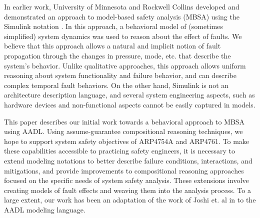 In earlier work, University of Minnesota and Rockwell Collins developed and demonstrated an approach to model-based safety analysis (MBSA) \cite {Joshi05:Dasc,Joshi05:SafeComp,NasaRep:MBSA-Aug05} using the Simulink notation \cite{MathWorks}.  In this approach, a behavioral model of (sometimes simplified) system dynamics was used to reason about the effect of faults.  We believe that this approach allows a natural and implicit notion of fault propagation through the changes in pressure, mode, etc. that describe the system's behavior.  Unlike qualitative approaches, this approach allows uniform reasoning about system functionality and failure behavior, and can describe complex temporal fault behaviors.  On the other hand, Simulink is not an architecture description language, and several system engineering aspects, such as hardware devices and non-functional aspects cannot be easily captured in models.

\iffalse
Over the last five years, several research groups have focused on formal reasoning at the system architecture level, resulting in MBSE tools that incorporate assume-guarantee compositional reasoning techniques~\cite{Trento and Rockwell and UMN}.  These tools allow behavioral reasoning about complex system models, but with substantially greater scalability than previous approaches.
\fi

This paper describes our initial work towards a behavioral approach to MBSA using AADL.  Using assume-guarantee compositional reasoning techniques, we hope to support system safety objectives of ARP4754A and ARP4761.  To make these capabilities accessible to practicing safety engineers, it is necessary to extend modeling notations to better describe failure conditions, interactions, and mitigations, and provide improvements to compositional reasoning approaches focused on the specific needs of system safety analysis.  These extensions involve creating models of fault effects and weaving them into the analysis process.  To a large extent, our work has been an adaptation of the work of Joshi et. al in \cite {Joshi05:Dasc,Joshi05:SafeComp,NasaRep:MBSA-Aug05} to the AADL modeling language.

\iffalse
This paper describes our initial work towards a behavioral approach to MBSA using AADL. In previous work we have extended the AADL language to add formal assume-guarantee contracts to specify behavioral requirements and compositional reasoning about system behavior.  Compared to the existing AADL Error Model Annex, these contracts provide a better, more natural, and more effective way to describe fault propagation and system behavior in the presence of failures.  To make these capabilities accessible to practicing safety engineers, it is necessary to extend modeling notations to better describe failure conditions, interactions, and mitigations, and provide improvements to compositional reasoning approaches focused on the specific needs of system safety analysis. These extensions involve creating models of fault effects and weaving them into the analysis process. To a large extent, our work has been an adaptation of the work of Joshi et. al to the AADL modeling language.
\fi


